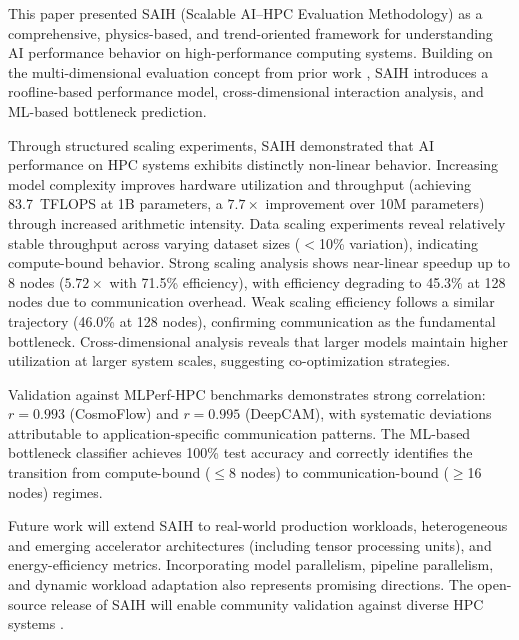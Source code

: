 \documentclass{llncs}
\begin{document}
This paper presented SAIH (Scalable AI--HPC Evaluation Methodology) as a comprehensive, physics-based, and trend-oriented framework for understanding AI performance behavior on high-performance computing systems. Building on the multi-dimensional evaluation concept from prior work \cite{Wang2024SAIH}, SAIH introduces a roofline-based performance model, cross-dimensional interaction analysis, and ML-based bottleneck prediction.

Through structured scaling experiments, SAIH demonstrated that AI performance on HPC systems exhibits distinctly non-linear behavior. Increasing model complexity improves hardware utilization and throughput (achieving 83.7~TFLOPS at 1B parameters, a $7.7\times$ improvement over 10M parameters) through increased arithmetic intensity. Data scaling experiments reveal relatively stable throughput across varying dataset sizes ($<$10\% variation), indicating compute-bound behavior. Strong scaling analysis shows near-linear speedup up to 8 nodes ($5.72\times$ with 71.5\% efficiency), with efficiency degrading to 45.3\% at 128 nodes due to communication overhead. Weak scaling efficiency follows a similar trajectory (46.0\% at 128 nodes), confirming communication as the fundamental bottleneck. Cross-dimensional analysis reveals that larger models maintain higher utilization at larger system scales, suggesting co-optimization strategies.

Validation against MLPerf-HPC benchmarks demonstrates strong correlation: $r=0.993$ (CosmoFlow) and $r=0.995$ (DeepCAM), with systematic deviations attributable to application-specific communication patterns. The ML-based bottleneck classifier achieves 100\% test accuracy and correctly identifies the transition from compute-bound ($\leq$8 nodes) to communication-bound ($\geq$16 nodes) regimes.

Future work will extend SAIH to real-world production workloads, heterogeneous and emerging accelerator architectures (including tensor processing units), and energy-efficiency metrics. Incorporating model parallelism, pipeline parallelism, and dynamic workload adaptation also represents promising directions. The open-source release of SAIH will enable community validation against diverse HPC systems \cite{Dongarra2020, Kurth2018}.



\end{document}
